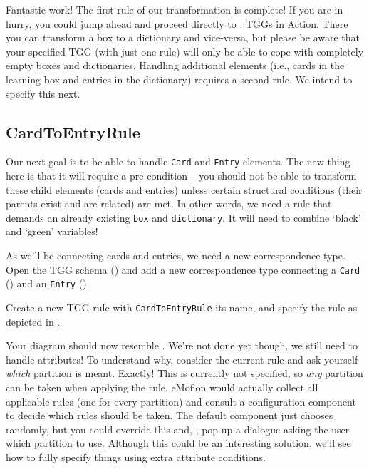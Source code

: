 Fantastic work! The first rule of our transformation is complete! 
If you are in hurry, you could jump ahead and proceed directly to : TGGs in Action. 
There you can transform a box to a dictionary and vice-versa, but please be aware that your specified TGG (with just one rule) will only be able to cope with completely empty boxes and dictionaries. 
Handling additional elements (i.e., cards in the learning box and entries in the dictionary) requires a second rule.
We intend to specify this next.

\subsection{CardToEntryRule}

Our next goal is to be able to handle \texttt{Card} and \texttt{Entry} elements. 
The new thing here is that it will require a pre-condition -- you should not be able to transform these child elements (cards and entries) unless certain structural conditions (their parents exist and are related) are met. 
In other words, we need a rule that demands an already existing \texttt{box} and \texttt{dictionary}. 
It will need to combine `black' and `green' variables! 

\begin{stepbystep}

\item As we'll be connecting cards and entries, we need a new correspondence type.
Open the TGG schema () and add a new correspondence type  connecting a \texttt{Card} () and an \texttt{Entry} ().

\item Create a new TGG rule with \texttt{CardToEntryRule} its name, and specify the rule as depicted in .
\end{stepbystep}

Your diagram should now resemble . 
We're not done yet though, we still need to handle attributes!
To understand why, consider the current rule and ask yourself  \emph{which} partition is meant.
Exactly!  This is currently not specified, so \emph{any} partition can be taken when applying the rule.
eMoflon would actually collect all applicable rules (one for every partition) and consult a configuration component to decide which rules should be taken.
The default component just chooses randomly, but you could override this and, \eg, pop up a dialogue asking the user which partition to use.
Although this could be an interesting solution, we'll see how to fully specify things using extra attribute conditions.

